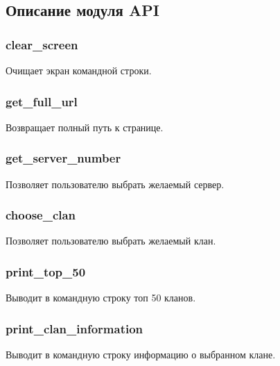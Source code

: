 
\parindent=1cm

\newpage

\subsection{Описание модуля API}

\subsubsection{clear\_screen}
Очищает экран командной строки.

\parindent=1cm

\subsubsection{get\_full\_url}
Возвращает полный путь к странице.

\parindent=1cm

\subsubsection{get\_server\_number}
Позволяет пользователю выбрать желаемый сервер.

\parindent=1cm

\subsubsection{choose\_clan}
Позволяет пользователю выбрать желаемый клан.

\parindent=1cm

\subsubsection{print\_top\_50}
Выводит в командную строку топ 50 кланов.

\parindent=1cm

\subsubsection{print\_clan\_information}
Выводит в командную строку информацию о выбранном клане.

\parindent=1cm

